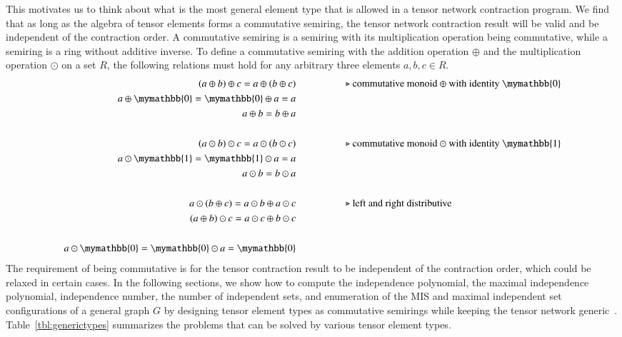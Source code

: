\documentclass[onefignum, onetabnum]{siamart190516}
\newcommand{\<}{\langle}
\renewcommand{\>}{\rangle}
\begin{document}
This motivates us to think about what is the most general element type that is allowed in a tensor network contraction program.
We find that as long as the algebra of tensor elements forms a commutative semiring, the tensor network contraction result will be valid and be independent of the contraction order.
A commutative semiring is a semiring with its multiplication operation being commutative, while a semiring is a ring without additive inverse.
To define a commutative semiring with the addition operation $\oplus$ and the multiplication operation $\odot$ on a set $R$, the following relations must hold for any arbitrary three elements $a, b, c \in R$.
\begin{align*}
(a \oplus b) \oplus c = a \oplus (b \oplus c) & \hspace{5em}\text{$\triangleright$ commutative monoid $\oplus$ with identity $\mymathbb{0}$}\\
a \oplus \mymathbb{0} = \mymathbb{0} \oplus a = a &\\
a \oplus b = b \oplus a &\\
&\\
(a \odot b) \odot c = a \odot (b \odot c)  &   \hspace{5em}\text{$\triangleright$ commutative monoid $\odot$ with identity $\mymathbb{1}$}\\
a \odot  \mymathbb{1} =  \mymathbb{1} \odot a = a &\\
a \odot b = b \odot a &\\
&\\
a \odot (b\oplus c) = a\odot b \oplus a\odot c  &  \hspace{5em}\text{$\triangleright$ left and right distributive}\\
(a\oplus b) \odot c = a\odot c \oplus b\odot c &\\
&\\
a \odot \mymathbb{0} = \mymathbb{0} \odot a = \mymathbb{0}
\end{align*}
The requirement of being commutative is for the tensor contraction result to be independent of the contraction order, which could be relaxed in certain cases. In the following sections, we show how to compute the independence polynomial,
the maximal independence polynomial, independence number, the number of independent sets, and enumeration of the MIS and maximal independent set configurations of a general graph $G$ by designing tensor element types as commutative semirings while keeping the tensor network generic~\cite{Stepanov2014}.
Table~\ref{tbl:generictypes} summarizes the problems that can be solved by various tensor element types. 
\end{document}
